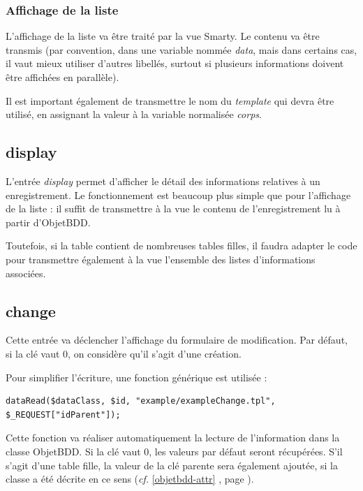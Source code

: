 \subsubsection{Affichage de la liste}
L'affichage de la liste va être traité par la vue Smarty. Le contenu va être transmis (par convention, dans une variable nommée \textit{data}, mais dans certains cas, il vaut mieux utiliser d'autres libellés, surtout si plusieurs informations doivent être affichées en parallèle).

Il est important également de transmettre le nom du \textit{template} qui devra être utilisé, en assignant la valeur à la variable normalisée \textit{corps}.

\subsection{display}

L'entrée \textit{display} permet d'afficher le détail des informations relatives à un enregistrement. Le fonctionnement est beaucoup plus simple que pour l'affichage de la liste : il suffit de transmettre à la vue le contenu de l'enregistrement lu à partir d'ObjetBDD.

Toutefois, si la table contient de nombreuses tables filles, il faudra adapter le code pour transmettre également à la vue l'ensemble des listes d'informations associées.

\subsection{change}

Cette entrée va déclencher l'affichage du formulaire de modification. Par défaut, si la clé vaut 0, on considère qu'il s'agit d'une création.

Pour simplifier l'écriture, une fonction générique est utilisée : 

\begin{lstlisting}
dataRead($dataClass, $id, "example/exampleChange.tpl", $_REQUEST["idParent"]);
\end{lstlisting}

Cette fonction va réaliser automatiquement la lecture de l'information dans la classe ObjetBDD. Si la clé vaut 0, les valeurs par défaut seront récupérées. S'il s'agit d'une table fille, la valeur de la clé parente sera également ajoutée, si la classe a été décrite en ce sens (\textit{cf.} \ref{objetbdd-attr} \textit{}, page \pageref{objetbdd-attr}).

